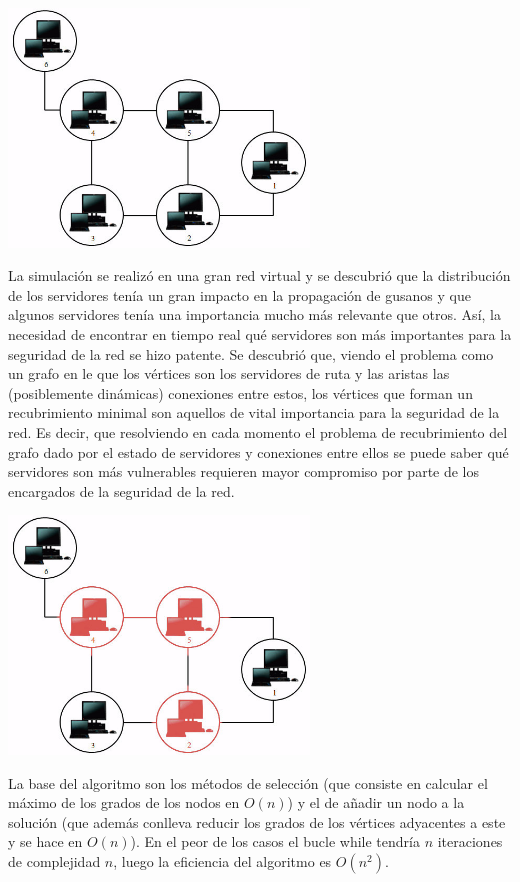 \documentclass[a4paper, 11pt]{article}
\begin{document}
\centering\includegraphics[width=0.6\textwidth]{inicial.jpg}

La simulación se realizó en una gran red virtual y se descubrió que la distribución de los servidores tenía un gran impacto en la propagación de gusanos y que algunos servidores tenía una importancia mucho más relevante que otros. Así, la necesidad de encontrar en tiempo real qué servidores son más importantes para la seguridad de la red se hizo patente. Se descubrió que, viendo el problema como un grafo en le que los vértices son los servidores de ruta y las aristas las (posiblemente dinámicas) conexiones entre estos, los vértices que forman un recubrimiento minimal son aquellos de vital importancia para la seguridad de la red. Es decir, que resolviendo en cada momento el problema de recubrimiento del grafo dado por el estado de servidores y conexiones entre ellos se puede saber qué servidores son más vulnerables  requieren mayor compromiso por parte de los encargados de la seguridad de la red.

\centering\includegraphics[width=0.6\textwidth]{cover.jpg}


La base del algoritmo son los métodos de selección (que consiste en calcular el máximo de los grados de los nodos en $O(n)$) y el de añadir un nodo a la solución (que además conlleva reducir los grados de los vértices adyacentes a este y se hace en $O(n)$).
En el peor de los casos el bucle while tendría $n$ iteraciones de complejidad $n$, luego la eficiencia del algoritmo es $O(n^2)$.
\end{document}
